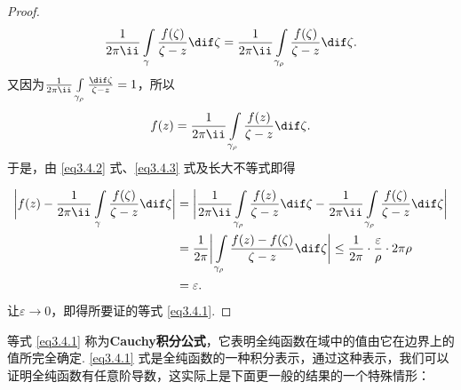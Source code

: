 \begin{proof}
\noindent\begin{minipage}{0.7\textwidth}
\begin{equation}\label{eq3.4.2}
\frac1{2\pi\ii}\int\limits_\gamma\frac{f(\zeta)}{\zeta-z}\dif \zeta
=\frac1{2\pi\ii}\int\limits_{\gamma_\rho}\frac{f(\zeta)}{\zeta-z}\dif \zeta.
\end{equation}
又因为$\frac1{2\pi\ii}\int\limits_{\gamma_\rho}\frac{\dif \zeta}{\zeta-z}=1$，所以
\begin{equation}\label{eq3.4.3}
f(z)=\frac1{2\pi\ii}\int\limits_{\gamma_\rho}\frac{f(z)}{\zeta-z}\dif \zeta.
\end{equation}
于是，由 \eqref{eq3.4.2} 式、\eqref{eq3.4.3} 式及长大不等式即得
\end{minipage}
\begin{minipage}{0.3\textwidth}
\centering
{}
\end{minipage}
\begin{align*}
\bigg|f(z)-\frac1{2\pi\ii}\int\limits_\gamma\frac{f(\zeta)}{\zeta-z}\dif \zeta\bigg|&=\bigg|\frac1{2\pi\ii}\int\limits_{\gamma_\rho}\frac{f(z)}{\zeta-z}\dif \zeta-\frac1{2\pi\ii}\int\limits_{\gamma_\rho}\frac{f(\zeta)}{\zeta-z}\dif \zeta\bigg|\\
&=\frac1{2\pi}\bigg|\int\limits_{\gamma_\rho}\frac{f(z)-f(\zeta)}{\zeta-z}\dif \zeta\bigg|\le\frac1{2\pi}\cdot\frac{\varepsilon}\rho\cdot2\pi\rho\\
&=\varepsilon.
\end{align*}
让$\varepsilon\to0$，即得所要证的等式 \eqref{eq3.4.1}.
\end{proof}

等式 \eqref{eq3.4.1} 称为\textbf{Cauchy积分公式}，它表明全纯函数在域中的值由它在边界上的值所完全确定. \eqref{eq3.4.1} 式是全纯函数的一种积分表示，通过这种表示，我们可以证明全纯函数有任意阶导数，这实际上是下面更一般的结果的一个特殊情形：

